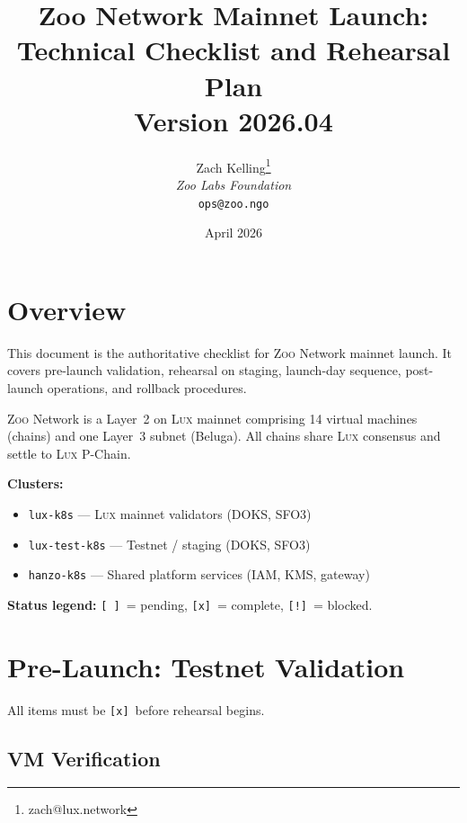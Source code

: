 \documentclass[11pt,letterpaper]{article}
\title{\textbf{Zoo Network Mainnet Launch:\\Technical Checklist and Rehearsal Plan}\\
\vspace{5pt}
\normalsize Version 2026.04}
\author{
Zach Kelling\thanks{zach@lux.network}\\
\textit{Zoo Labs Foundation}\\
\texttt{ops@zoo.ngo}
}
\date{April 2026}
\newcommand{\pending}{\texttt{[ ]}}
\newcommand{\done}{\texttt{[x]}}
\newcommand{\blocked}{\texttt{[!]}}
\newcommand{\Zoo}{\textsc{Zoo}}
\newcommand{\Lux}{\textsc{Lux}}
\begin{document}
\zoocoverpage

\tableofcontents
\newpage

\section{Overview}

This document is the authoritative checklist for \Zoo{} Network mainnet launch.
It covers pre-launch validation, rehearsal on staging, launch-day sequence,
post-launch operations, and rollback procedures.

\Zoo{} Network is a Layer~2 on \Lux{} mainnet comprising 14 virtual machines
(chains) and one Layer~3 subnet (Beluga). All chains share \Lux{} consensus
and settle to \Lux{} P-Chain.

\medskip
\noindent\textbf{Clusters:}
\begin{itemize}[nosep]
  \item \texttt{lux-k8s} --- \Lux{} mainnet validators (DOKS, SFO3)
  \item \texttt{lux-test-k8s} --- Testnet / staging (DOKS, SFO3)
  \item \texttt{hanzo-k8s} --- Shared platform services (IAM, KMS, gateway)
\end{itemize}

\noindent\textbf{Status legend:}
\pending\ = pending,
\done\ = complete,
\blocked\ = blocked.

\section{Pre-Launch: Testnet Validation}

All items must be \done\ before rehearsal begins.

\subsection{VM Verification}
\end{document}
